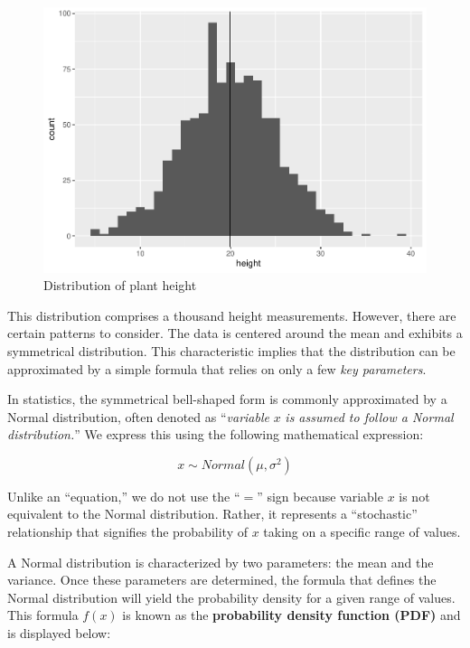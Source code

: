 \documentclass[
]{book}
\begin{document}
\begin{figure}

{\centering \includegraphics{_main_files/figure-latex/histogram-height-1} 

}

\caption{Distribution of plant height}\label{fig:histogram-height}
\end{figure}

This distribution comprises a thousand height measurements. However, there are certain patterns to consider. The data is centered around the mean and exhibits a symmetrical distribution. This characteristic implies that the distribution can be approximated by a simple formula that relies on only a few \emph{key parameters}.

In statistics, the symmetrical bell-shaped form is commonly approximated by a Normal distribution, often denoted as ``\emph{variable} \(x\) \emph{is assumed to follow a Normal distribution.}'' We express this using the following mathematical expression:

\[
x \sim Normal(\mu, \sigma^2)
\]

Unlike an ``equation,'' we do not use the ``\(=\)'' sign because variable \(x\) is not equivalent to the Normal distribution. Rather, it represents a ``stochastic'' relationship that signifies the probability of \(x\) taking on a specific range of values.

A Normal distribution is characterized by two parameters: the mean and the variance. Once these parameters are determined, the formula that defines the Normal distribution will yield the probability density for a given range of values. This formula \(f(x)\) is known as the \textbf{probability density function (PDF)} and is displayed below:
\end{document}

